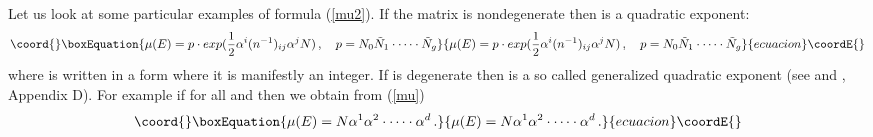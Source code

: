\documentclass[a4paper,a4paper]{article}
\begin{document}
Let us look at some particular examples of formula (\ref{mu2}). 
 If the matrix \coordHE{} is nondegenerate then \coordHE{} is a quadratic exponent:
\begin{equation}\coord{}\boxEquation{
\mu(E) = p\cdot exp( \frac{1}{2}\alpha^{i}(n^{-1})_{ij} \alpha^{j} N) \, , \quad p=N_{0}\tilde N_{1}\cdot \dots \cdot \tilde N_{g} 
}{
\mu(E) = p\cdot exp( \frac{1}{2}\alpha^{i}(n^{-1})_{ij} \alpha^{j} N) \, , \quad p=N_{0}\tilde N_{1}\cdot \dots \cdot \tilde N_{g} 
}{ecuacion}\coordE{}\end{equation} 
where \coordHE{} is written in a form where it is manifestly an integer.  
If \coordHE{} is degenerate then \coordHE{} is a so called generalized quadratic exponent (see \cite{AstSchw} and \cite{KS}, Appendix D). 
For example if \coordHE{} for all \coordHE{} and \coordHE{} then we obtain from (\ref{mu}) 
\begin{equation}\coord{}\boxEquation{
\mu(E) = N \alpha^{1}\alpha^{2}\cdot \dots \cdot \alpha^{d} \, .
}{
\mu(E) = N \alpha^{1}\alpha^{2}\cdot \dots \cdot \alpha^{d} \, .
}{ecuacion}\coordE{}\end{equation}

            
\end{document}
